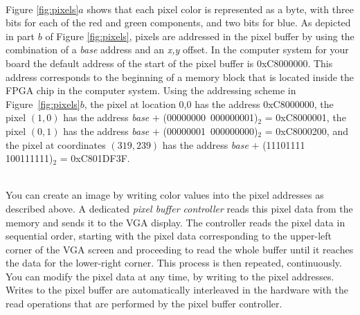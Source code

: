 \documentclass[epsfig,10pt,fullpage]{article}
\begin{document}
~\\
\noindent
Figure \ref{fig:pixels}$a$ shows that each pixel color is represented as a byte, 
with three bits for each of the red and green components, and two bits for blue.  As depicted in 
part $b$ of Figure \ref{fig:pixels}, pixels are addressed in the pixel buffer by 
using the combination of a {\it base} address and an {\it x,y} offset. In the computer 
system for your board the default address of the start of the pixel buffer is {\sf 0xC8000000}.
This address corresponds to the beginning of a memory block that is located inside the FPGA
chip in the computer system. Using the addressing scheme in Figure~\ref{fig:pixels}$b$, 
the pixel at location 0,0 has the address {\sf 0xC8000000}, the pixel $(1,0)$ 
has the address {\it base} $+$ (00000000~000000001)$_2$ = {\sf 0xC8000001}, the pixel $(0,1)$ 
has the address {\it base} $+$ (00000001~000000000)$_2$ = {\sf 0xC8000200}, and the pixel 
at coordinates $(319,239)$ has the address {\it base} $+$ (11101111 100111111)$_2$ =
{\sf 0xC801DF3F}. 

~\\
\noindent
You can create an image by writing color values into the pixel addresses as described
above. A dedicated {\it pixel buffer controller} reads this pixel data from the memory and 
sends it to the VGA display.  The controller reads the pixel data in sequential order, 
starting with the pixel data corresponding to the upper-left corner of the VGA screen and 
proceeding to read the whole buffer until it reaches the data for the lower-right corner. This 
process is then repeated, continuously.  You can modify the pixel data at any time, by writing 
to the pixel addresses. Writes to the pixel buffer are automatically interleaved in the 
hardware with the read operations that are performed by the pixel buffer controller. 
\end{document}
